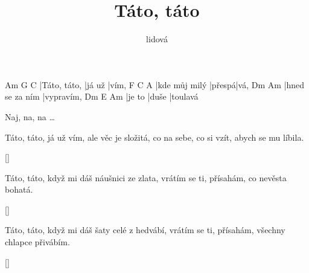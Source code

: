 \documentclass{song}
\title{Táto, táto}
\author{lidová}
\begin{document}
\strophe
Am           G      C
|Táto, táto, |já už |vím,
F             C      A\7
|kde můj milý |přespá|vá,
Dm              Am
|hned se za ním |vypravím,
Dm     E     Am
|je to |duše |toulavá
\endstrophe

Naj, na, na \ldots
\endstrophe

\strophe*
Táto, táto, já už vím,
ale věc je složitá,
co na sebe, co si vzít,
abych se mu líbila.
\endstrophe

\ref{}

\strophe*
Táto, táto, když mi dáš
náušnici ze zlata,
vrátím se ti, přísahám,
co nevěsta bohatá.
\endstrophe

\ref{}

\strophe*
Táto, táto, když mi dáš
šaty celé z hedvábí,
vrátím se ti, přísahám,
všechny chlapce přivábím.
\endstrophe

\ref{}
\end{document}
